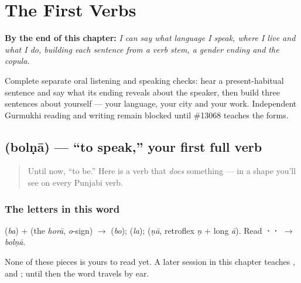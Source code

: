
\chapter{The First Verbs}
\label{ch:first-verbs}

\begin{chapteropening}
\textbf{By the end of this chapter:} \emph{I can say what language I speak, where I live and what I do, building each sentence from a verb stem, a gender ending and the copula.}

Complete separate oral listening and speaking checks: hear a present-habitual sentence and say what its ending reveals about the speaker, then build three sentences about yourself — your language, your city and your work. Independent Gurmukhi reading and writing remain blocked until \#13068 teaches the forms.
\end{chapteropening}

\section[\texorpdfstring{\pa{ਬੋਲਣਾ} (bolṇā)}{ਬੋਲਣਾ (bolṇā)}]{ (bolṇā) — \textquotedblleft{}to speak,\textquotedblright{} your first full verb}

\label{lesson:PA-C05-bolna}



\begin{quote}
Until now, \textquotedblleft{}to be.\textquotedblright{} Here is a verb that \emph{does} something — in a shape you'll see on every Punjabi verb.
\end{quote}

\subsection*{The letters in this word}
\textbf{} (\emph{ba}) + \textbf{} (the \emph{horā}, \emph{o}-sign) $\to$ \textbf{} (\emph{bo}); \textbf{} (\emph{la}); \textbf{} (\emph{ṇā}, retroflex \emph{ṇ} + long \emph{ā}). Read \textbf{··} $\to$ \emph{bolṇā}.

None of these pieces is yours to read yet. A later session in this chapter teaches \textbf{}, \textbf{} and \textbf{}; until then the word travels by ear.

